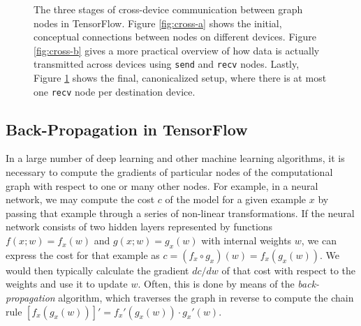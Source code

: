 \begin{figure}
\begin{subfigure}[h]{0.30\textwidth}
    \caption{}
    \label{fig:cross-c}
  \end{subfigure}
  \caption{The three stages of cross-device communication between graph nodes in
    TensorFlow. Figure \ref{fig:cross-a} shows the initial, conceptual
    connections between nodes on different devices. Figure \ref{fig:cross-b}
    gives a more practical overview of how data is actually transmitted across
    devices using \texttt{send} and \texttt{recv} nodes. Lastly, Figure
    \ref{fig:cross-c} shows the final, canonicalized setup, where there is at
    most one \texttt{recv} node per destination device.}
  \label{fig:cross}
\end{figure}

\subsection{Back-Propagation in TensorFlow}\label{sec:model-ext-backprop}

In a large number of deep learning and other machine learning algorithms, it is
necessary to compute the gradients of particular nodes of the computational
graph with respect to one or many other nodes. For example, in a neural network,
we may compute the cost $c$ of the model for a given example $x$ by passing that
example through a series of non-linear transformations. If the neural network
consists of two hidden layers represented by functions $f(x;w) = f_x(w)$ and
$g(x;w) = g_x(w)$ with internal weights $w$, we can express the cost for that
example as $c = (f_x \circ g_x)(w) = f_x(g_x(w))$. We would then typically
calculate the gradient $dc/dw$ of that cost with respect to the weights and use
it to update $w$. Often, this is done by means of the \emph{back-propagation}
algorithm, which traverses the graph in reverse to compute the chain rule
$[f_x(g_x(w))]' = f_x'(g_x(w)) \cdot g_x'(w)$.

